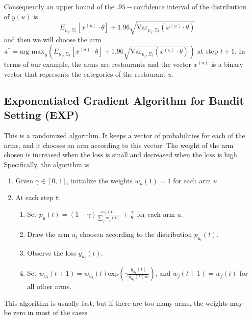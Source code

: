 \documentclass{article}
\theoremstyle{plain}
\theoremstyle{definition}
\begin{document}
Consequently an upper bound of the $.95-$confidence interval of the distribution
of $y\left(u\right)$ is 
\[
E_{\mu_{t},\Sigma_{t}}\left[x^{\left(u\right)}\cdot\theta\right]+1.96\sqrt{\mbox{Var}_{\mu_{t},\Sigma_{t}}\left(x^{\left(u\right)}\cdot\theta\right)}
\]
and then we will choose the arm $u^{*}=\mbox{arg max}_{u}\left(E_{\mu_{t},\Sigma_{t}}\left[x^{\left(u\right)}\cdot\theta\right]+1.96\sqrt{\mbox{Var}_{\mu_{t},\Sigma_{t}}\left(x^{\left(u\right)}\cdot\theta\right)}\right)$
at step $t+1$. In terms of our example, the arms are restaurants
and the vector $x^{\left(u\right)}$ is a binary vector that represents
the categories of the restaurant $u$.

\subsection{Exponentiated Gradient Algorithm for Bandit Setting (EXP)}

This is a randomized algorithm. It keeps a vector of probabilities
for each of the arms, and it chooses an arm according to this vector.
The weight of the arm chosen is increased when the loss is small and
decreased when the loss is high. Specifically, the algorithm is
\begin{enumerate}
\item Given $\gamma\in\left[0,1\right]$, initialize the weights $w_{u}\left(1\right)=1$
for each arm $u$.
\item At each step $t$:

\begin{enumerate}
\item Set $p_{u}\left(t\right)=\left(1-\gamma\right)\frac{w_{u}\left(t\right)}{\sum_{j}w_{j}\left(t\right)}+\frac{\gamma}{K}$
for each arm $u$.
\item Draw the arm $u_{t}$ choosen according to the distribution $p_{u_{t}}\left(t\right)$.
\item Observe the loss $y_{u_{t}}\left(t\right)$.
\item Set $w_{u_{t}}\left(t+1\right)=w_{u_{t}}\left(t\right)\mbox{exp}\left(\gamma\frac{y_{u_{t}}\left(t\right)}{p_{u_{t}}\left(t\right)m}\right)$,
and $w_{j}\left(t+1\right)=w_{j}\left(t\right)$ for all other arms. 
\end{enumerate}
\end{enumerate}
This algorithm is usually fast, but if there are too many arms, the
weights may be zero in most of the cases. 
\end{document}
